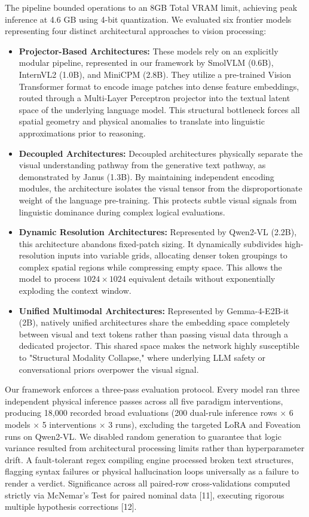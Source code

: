 \documentclass{article}
\begin{document}
The pipeline bounded operations to an 8GB Total VRAM limit, achieving peak inference at 4.6 GB using 4-bit quantization. We evaluated six frontier models representing four distinct architectural approaches to vision processing:
\begin{itemize}
    \item \textbf{Projector-Based Architectures:} These models rely on an explicitly modular pipeline, represented in our framework by SmolVLM (0.6B), InternVL2 (1.0B), and MiniCPM (2.8B). They utilize a pre-trained Vision Transformer format to encode image patches into dense feature embeddings, routed through a Multi-Layer Perceptron projector into the textual latent space of the underlying language model. This structural bottleneck forces all spatial geometry and physical anomalies to translate into linguistic approximations prior to reasoning.
    \item \textbf{Decoupled Architectures:} Decoupled architectures physically separate the visual understanding pathway from the generative text pathway, as demonstrated by Janus (1.3B). By maintaining independent encoding modules, the architecture isolates the visual tensor from the disproportionate weight of the language pre-training. This protects subtle visual signals from linguistic dominance during complex logical evaluations.
    \item \textbf{Dynamic Resolution Architectures:} Represented by Qwen2-VL (2.2B), this architecture abandons fixed-patch sizing. It dynamically subdivides high-resolution inputs into variable grids, allocating denser token groupings to complex spatial regions while compressing empty space. This allows the model to process $1024 \times 1024$ equivalent details without exponentially exploding the context window.
    \item \textbf{Unified Multimodal Architectures:} Represented by Gemma-4-E2B-it (2B), natively unified architectures share the embedding space completely between visual and text tokens rather than passing visual data through a dedicated projector. This shared space makes the network highly susceptible to "Structural Modality Collapse," where underlying LLM safety or conversational priors overpower the visual signal.
\end{itemize}

Our framework enforces a three-pass evaluation protocol. Every model ran three independent physical inference passes across all five paradigm interventions, producing 18,000 recorded broad evaluations (200 dual-rule inference rows $\times$ 6 models $\times$ 5 interventions $\times$ 3 runs), excluding the targeted LoRA and Foveation runs on Qwen2-VL. We disabled random generation to guarantee that logic variance resulted from architectural processing limits rather than hyperparameter drift. A fault-tolerant regex compiling engine processed broken text structures, flagging syntax failures or physical hallucination loops universally as a failure to render a verdict. Significance across all paired-row cross-validations computed strictly via McNemar's Test for paired nominal data [11], executing rigorous multiple hypothesis corrections [12].
\end{document}
